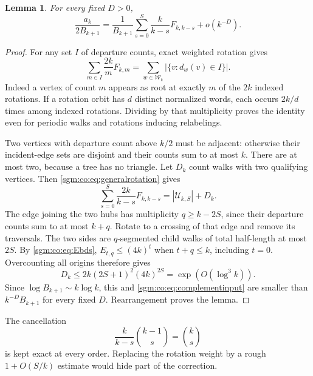 \documentclass[11pt,letterpaper]{article}
\newtheorem{lemma}[theorem]{Lemma}\newtheorem{proposition}[theorem]{Proposition}\newtheorem{corollary}[theorem]{Corollary}
\theoremstyle{remark}\newtheorem{remark}[theorem]{Remark}
\newcommand{\Wc}{\mathcal W}\newcommand{\Uc}{\mathcal U}\newcommand{\Part}{\operatorname{Part}}
\theoremstyle{definition}\newtheorem{definition}[theorem]{Definition}
\begin{document}
\begin{lemma}\label{sgm:co:lem:reduction}
For every fixed $D>0$,
\begin{equation}\label{sgm:co:eq:reduction}
 \frac{a_k}{2B_{k+1}}=
 \frac1{B_{k+1}}\sum_{s=0}^S\frac{k}{k-s}F_{k,k-s}+o(k^{-D}).
\end{equation}
\end{lemma}
\begin{proof}
For any set $I$ of departure counts, exact weighted rotation gives
\begin{equation}\label{sgm:co:eq:generalrotation}
 \sum_{m\in I}\frac{2k}{m}F_{k,m}
 =\sum_{w\in\Wc_k}|\{v:d_w(v)\in I\}|.
\end{equation}
Indeed a vertex of count $m$ appears as root at exactly $m$ of the $2k$ indexed rotations. If a rotation orbit has $d$ distinct normalized words, each occurs $2k/d$ times among indexed rotations. Dividing by that multiplicity proves the identity even for periodic walks and rotations inducing relabelings.

Two vertices with departure count above $k/2$ must be adjacent: otherwise their incident-edge sets are disjoint and their counts sum to at most $k$. There are at most two, because a tree has no triangle. Let $D_k$ count walks with two qualifying vertices. Then \eqref{sgm:co:eq:generalrotation} gives
\[
 \sum_{s=0}^S\frac{2k}{k-s}F_{k,k-s}=|\Uc_{k,S}|+D_k.
\]
The edge joining the two hubs has multiplicity $q\ge k-2S$, since their departure counts sum to at most $k+q$. Rotate to a crossing of that edge and remove its traversals. The two sides are $q$-segmented child walks of total half-length at most $2S$. By \eqref{sgm:co:eq:Ebds}, $E_{t,q}\le(4k)^t$ when $t+q\le k$, including $t=0$. Overcounting all origins therefore gives
\begin{equation}\label{sgm:co:eq:Dsmall}
 D_k\le2k(2S+1)^2(4k)^{2S}=\exp(O(\log^3k)).
\end{equation}
Since $\log B_{k+1}\sim k\log k$, this and \eqref{sgm:co:eq:complementinput} are smaller than $k^{-D}B_{k+1}$ for every fixed $D$. Rearrangement proves the lemma.
\end{proof}
The cancellation
\begin{equation}\label{sgm:co:eq:rotationcancel}
 \frac{k}{k-s}\binom{k-1}{s}=\binom ks
\end{equation}
is kept exact at every order. Replacing the rotation weight by a rough $1+O(S/k)$ estimate would hide part of the correction.
\end{document}
